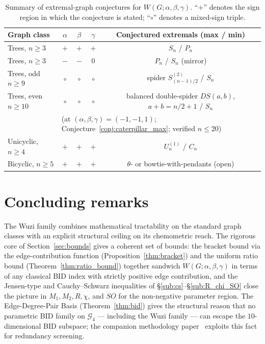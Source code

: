 \documentclass[11pt,a4paper]{article}
\theoremstyle{definition}
\newcommand{\Wuzi}{W(G;\alpha,\beta,\gamma)}
\begin{document}
\begin{table}[h]
\centering
\small
\caption{Summary of extremal-graph conjectures for $\Wuzi$. ``$+$'' denotes the sign region in which the conjecture is stated; ``$\circ$'' denotes a mixed-sign triple.}
\label{tab:extremals}
\begin{tabular}{lcccc}
\toprule
Graph class & $\alpha$ & $\beta$ & $\gamma$ & Conjectured extremals (max / min)\\
\midrule
Trees, $n\ge 3$ & $+$ & $+$ & $+$ & $S_n$ / $P_n$\\
Trees, $n\ge 3$ & $-$ & $-$ & $0$ & $P_n$ / $S_n$ (mirror)\\
Trees, odd $n \ge 9$ & $\circ$ & $\circ$ & $\circ$ & spider $S^{(2)}_{(n-1)/2}$ / $S_n$\\
Trees, even $n \ge 10$ & $\circ$ & $\circ$ & $\circ$ & balanced double-spider $DS(a, b)$, $a+b = n/2 + 1$ / $S_n$\\
                & \multicolumn{4}{l}{\quad (at $(\alpha,\beta,\gamma)=(-1,-1,1)$; Conjecture~\ref{conj:caterpillar_max}; verified $n \le 20$)}\\
Unicyclic, $n\ge 4$ & $+$ & $+$ & $+$ & $U_n^{(1)}$ / $C_n$\\
Bicyclic, $n\ge 5$ & $+$ & $+$ & $+$ & $\theta$- or bowtie-with-pendants (open)\\
\bottomrule
\end{tabular}
\end{table}

\section{Concluding remarks}\label{sec:conclusion}

The Wuzi family combines mathematical tractability on the standard
graph classes with an explicit structural ceiling on its
chemometric reach. The rigorous core of Section~\ref{sec:bounds}
gives a coherent set of bounds: the bracket bound via the
edge-contribution function (Proposition~\ref{thm:bracket}) and the
uniform ratio bound (Theorem~\ref{thm:ratio_bound}) together
sandwich $\Wuzi$ in terms of any classical BID index with strictly
positive edge contribution, and the Jensen-type and
Cauchy--Schwarz inequalities of \S\ref{sub:cs}--\S\ref{sub:R_chi_SO}
close the picture in $M_1, M_2, R, \chi$, and $SO$ for the
non-negative parameter region. The Edge-Degree-Pair Basis
(Theorem~\ref{thm:bid}) gives the structural reason that no
parametric BID family on $\mathcal{G}_4$ --- including the Wuzi
family --- can escape the $10$-dimensional BID subspace; the
companion methodology paper~\cite{Paper2_Screening} exploits this
fact for redundancy screening.
\end{document}
